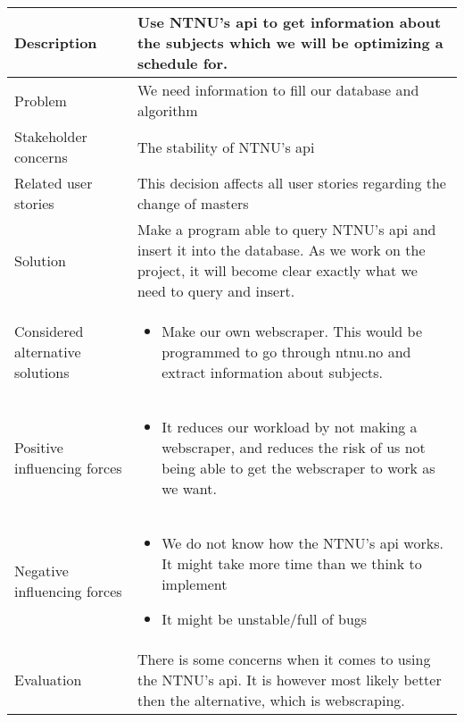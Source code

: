 \documentclass[pdftex, 10pt, norsk, a4paper, twoside]{article}
\numberwithin{equation}{section}
\numberwithin{figure}{section}
\numberwithin{table}{section}
\begin{document}
\newpage

\begin{center} %

\hfill

\section*{}

\begin{tabular}{| >{\centering\arraybackslash} m{4cm} | m{9cm} | }
\hline
Description & Use NTNU's api to get information about the subjects which we will be optimizing a schedule for. \\
\hline
Problem & We need information to fill our database and algorithm \\
\hline
Stakeholder concerns & The stability of NTNU's api\\
\hline
Related user stories & This decision affects all user stories regarding the change of masters \\
\hline
Solution & Make a program able to query NTNU's api and insert it into the database. As we work on the project, it will become clear exactly what we need to query and insert. \\
\hline
Considered alternative solutions& 
\begin{itemize}
    \item Make our own webscraper. This would be programmed to go through ntnu.no and extract information about subjects.
\end{itemize}\\
\hline
Positive influencing forces& 
\begin{itemize}
    \item It reduces our workload by not making a webscraper, and reduces the risk of us not being able to get the webscraper to work as we want.
\end{itemize}\\
\hline
Negative influencing forces& 
\begin{itemize}
    \item We do not know how the NTNU's api works. It might take more time than we think to implement
    \item It might be unstable/full of bugs
\end{itemize}\\
\hline
Evaluation & There is some concerns when it comes to using the NTNU's api. It is however most likely better then the alternative, which is webscraping. \\
\hline
\end{tabular}
\end{center}  %
\end{document}

